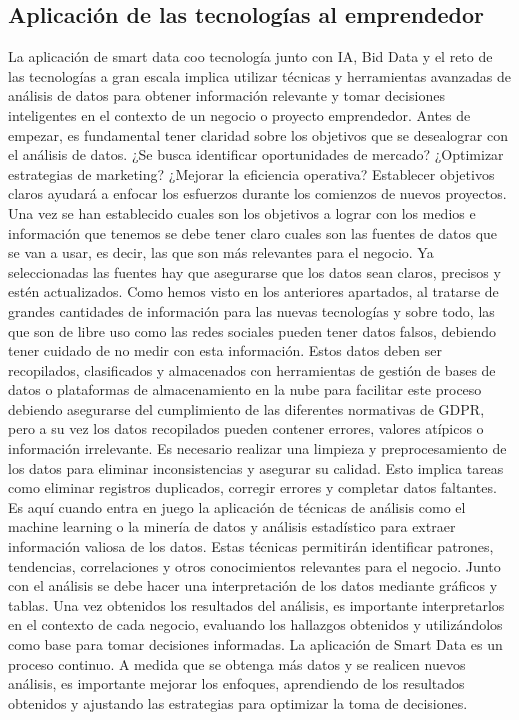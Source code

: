 \documentclass[
  letterpaper,
  DIV=11,
  numbers=noendperiod]{scrreprt}
\begin{document}
\hypertarget{aplicaciuxf3n-de-las-tecnologuxedas-al-emprendedor}{%
\subsection{Aplicación de las tecnologías al
emprendedor}\label{aplicaciuxf3n-de-las-tecnologuxedas-al-emprendedor}}

La aplicación de smart data coo tecnología junto con IA, Bid Data y el
reto de las tecnologías a gran escala implica utilizar técnicas y
herramientas avanzadas de análisis de datos para obtener información
relevante y tomar decisiones inteligentes en el contexto de un negocio o
proyecto emprendedor. Antes de empezar, es fundamental tener claridad
sobre los objetivos que se desealograr con el análisis de datos. ¿Se
busca identificar oportunidades de mercado? ¿Optimizar estrategias de
marketing? ¿Mejorar la eficiencia operativa? Establecer objetivos claros
ayudará a enfocar los esfuerzos durante los comienzos de nuevos
proyectos. Una vez se han establecido cuales son los objetivos a lograr
con los medios e información que tenemos se debe tener claro cuales son
las fuentes de datos que se van a usar, es decir, las que son más
relevantes para el negocio. Ya seleccionadas las fuentes hay que
asegurarse que los datos sean claros, precisos y estén actualizados.
Como hemos visto en los anteriores apartados, al tratarse de grandes
cantidades de información para las nuevas tecnologías y sobre todo, las
que son de libre uso como las redes sociales pueden tener datos falsos,
debiendo tener cuidado de no medir con esta información. Estos datos
deben ser recopilados, clasificados y almacenados con herramientas de
gestión de bases de datos o plataformas de almacenamiento en la nube
para facilitar este proceso debiendo asegurarse del cumplimiento de las
diferentes normativas de GDPR, pero a su vez los datos recopilados
pueden contener errores, valores atípicos o información irrelevante. Es
necesario realizar una limpieza y preprocesamiento de los datos para
eliminar inconsistencias y asegurar su calidad. Esto implica tareas como
eliminar registros duplicados, corregir errores y completar datos
faltantes. Es aquí cuando entra en juego la aplicación de técnicas de
análisis como el machine learning o la minería de datos y análisis
estadístico para extraer información valiosa de los datos. Estas
técnicas permitirán identificar patrones, tendencias, correlaciones y
otros conocimientos relevantes para el negocio. Junto con el análisis se
debe hacer una interpretación de los datos mediante gráficos y tablas.
Una vez obtenidos los resultados del análisis, es importante
interpretarlos en el contexto de cada negocio, evaluando los hallazgos
obtenidos y utilizándolos como base para tomar decisiones informadas. La
aplicación de Smart Data es un proceso continuo. A medida que se obtenga
más datos y se realicen nuevos análisis, es importante mejorar los
enfoques, aprendiendo de los resultados obtenidos y ajustando las
estrategias para optimizar la toma de decisiones.
\end{document}

